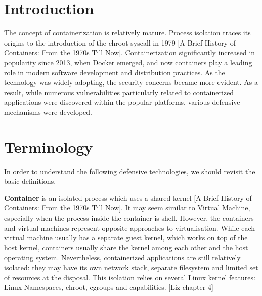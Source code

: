 \section{Introduction}

The concept of containerization is relatively mature. Process isolation traces its origins to the introduction of the chroot syscall in 1979 [A Brief History of Containers: From the 1970s Till Now]. Containerization significantly increased in popularity since 2013, when Docker emerged, and now containers play a leading role in modern software development and distribution practices. As the technology was widely adopting, the security concerns became more evident. As a result, while numerous vulnerabilities particularly related to containerized applications were discovered within the popular platforms, various defensive mechanisms were developed.

\section{Terminology}

In order to understand the following defensive technologies, we should revisit the basic definitions. 

\textbf{Container} is an isolated process which uses a shared kernel [A Brief History of Containers: From the 1970s Till Now]. It may seem similar to Virtual Machine, especially when the process inside the container is shell. However, the containers and virtual machines represent opposite approaches to virtualisation. While each virtual machine usually has a separate guest kernel, which works on top of the host kernel, containers usually share the kernel among each other and the host operating system. Nevertheless, containerized applications are still relatively isolated: they may have its own network stack, separate filesystem and limited set of resources at the disposal. This isolation relies on several Linux kernel features: Linux Namespaces, chroot, cgroups and capabilities. [Liz chapter 4]

